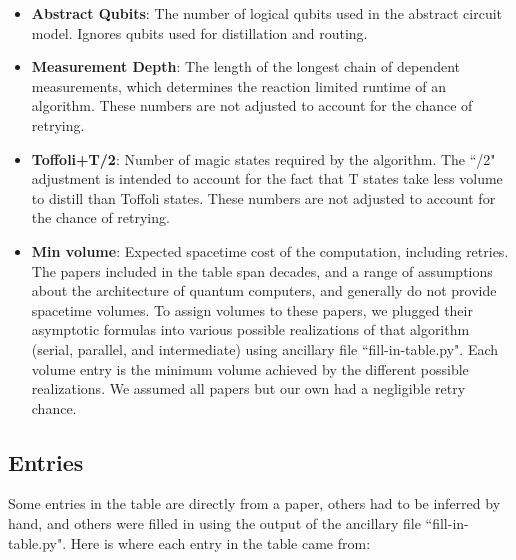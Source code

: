 \documentclass[a4paper, onecolumn, accepted=2021-03-29]{quantumarticle}
\begin{document}
\begin{itemize}
    \item \textbf{Abstract Qubits}:
        The number of logical qubits used in the abstract circuit model.
        Ignores qubits used for distillation and routing.
    \item \textbf{Measurement Depth}:
        The length of the longest chain of dependent measurements, which determines the reaction limited runtime of an algorithm.
        These numbers are not adjusted to account for the chance of retrying.
    \item \textbf{Toffoli+T/2}:
        Number of magic states required by the algorithm.
        The ``/2" adjustment is intended to account for the fact that T states take less volume to distill than Toffoli states.
        These numbers are not adjusted to account for the chance of retrying.
    \item \textbf{Min volume}:
        Expected spacetime cost of the computation, including retries.
        The papers included in the table span decades, and a range of assumptions about the architecture of quantum computers, and generally do not provide spacetime volumes.
        To assign volumes to these papers, we plugged their asymptotic formulas into various possible realizations of that algorithm (serial, parallel, and intermediate) using ancillary file ``fill-in-table.py".
        Each volume entry is the minimum volume achieved by the different possible realizations.
        We assumed all papers but our own had a negligible retry chance.
\end{itemize}


\subsection{Entries}

Some entries in the table are directly from a paper, others had to be inferred by hand, and others were filled in using the output of the ancillary file ``fill-in-table.py".
Here is where each entry in the table came from:
\end{document}
